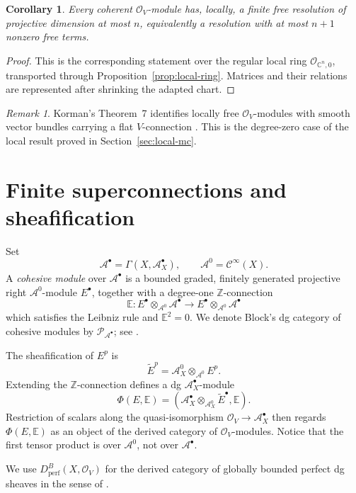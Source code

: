 \documentclass[12pt]{amsart}
\newtheorem{cor}[thm]{Corollary}
\theoremstyle{definition}
\theoremstyle{remark}
\newtheorem{rem}[thm]{Remark}
\numberwithin{equation}{section}
\newcommand{\CA}{\mathcal A}
\newcommand{\CO}{\mathcal O}
\newcommand{\C}{\mathbb C}
\newcommand{\cinf}{\mathcal C^\infty}
\begin{document}
\begin{cor}\label{cor:coherent-resolution}
Every coherent \(\CO_V\)-module has, locally, a finite free resolution of
projective dimension at most \(n\), equivalently a resolution with at most
\(n+1\) nonzero free terms.
\end{cor}

\begin{proof}
This is the corresponding statement over the regular local ring
\(\CO_{\C^n,0}\), transported through Proposition~\ref{prop:local-ring}.
Matrices and their relations are represented after shrinking the adapted
chart.
\end{proof}

\begin{rem}
Korman's Theorem~7 identifies locally free \(\CO_V\)-modules with smooth
vector bundles carrying a flat \(V\)-connection \cite{Korman2014}.  This is
the degree-zero case of the local result proved in Section~\ref{sec:local-mc}.
\end{rem}

\section{Finite superconnections and sheafification}

Set
\[
\CA^\bullet=\Gamma(X,\CA_X^\bullet),
\qquad
\CA^0=\cinf(X).
\]
A \emph{cohesive module} over \(\CA^\bullet\) is a bounded graded,
finitely generated projective right \(\CA^0\)-module \(E^\bullet\), together
with a degree-one \(\mathbb Z\)-connection
\[
\mathbb E:
E^\bullet\otimes_{\CA^0}\CA^\bullet
\longrightarrow
E^\bullet\otimes_{\CA^0}\CA^\bullet
\]
which satisfies the Leibniz rule and \(\mathbb E^2=0\).  We denote Block's
dg category of cohesive modules by \(\mathcal P_{\CA^\bullet}\); see
\cite[Section~2]{Block2010}.

The sheafification of \(E^p\) is
\[
\widetilde E^p
=\CA_X^0\otimes_{\CA^0}E^p.
\]
Extending the \(\mathbb Z\)-connection defines a dg
\(\CA_X^\bullet\)-module
\[
\Phi(E,\mathbb E)
=
\left(
\CA_X^\bullet\otimes_{\CA_X^0}\widetilde E^\bullet,
\mathbb E
\right).
\]
Restriction of scalars along the quasi-isomorphism
\(\CO_V\to\CA_X^\bullet\) then regards \(\Phi(E,\mathbb E)\) as an object of
the derived category of \(\CO_V\)-modules.  Notice that the first tensor
product is over \(\CA^0\), not over \(\CA^\bullet\).

We use \(D_{\mathrm{perf}}^B(X,\CO_V)\) for the derived category of globally
bounded perfect dg sheaves in the sense of
\cite[Definition~7.3 and the paragraph following Remark~7.2]{CHL2021}.
\end{document}
